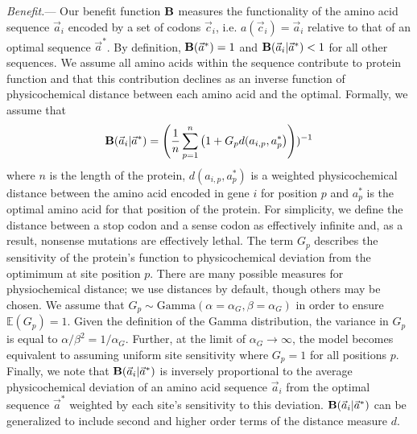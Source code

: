 \documentclass[12pt,letterpaper]{article}
\renewcommand{\subsubsection}[1]{%
\vspace{2ex}
\noindent
\textit{#1.}---}
\newcommand{\EE}{\mathbb{E}} %
\newcommand{\Funcaoptvec}{\ensuremath{\Func(\aoptvec)}\xspace}
\newcommand{\Funcaveci}{\ensuremath{\Func(\aveci|\aoptvec)}\xspace}
\newcommand{\Func}{\ensuremath{\text{\textbf{B}}}\xspace}
\newcommand{\aip}{\ensuremath{a_{i,p}}\xspace}
\newcommand{\alphag}{\ensuremath{\alpha_G}\xspace}
\newcommand{\aoptp}{\ensuremath{a^*_p}\xspace}
\newcommand{\aoptvec}{\ensuremath{\Vec{a}^*}\xspace}
\newcommand{\aveci}{\ensuremath{\Vec{a}_i}\xspace}
\newcommand{\cveci}{\ensuremath{\cvec_i}\xspace}
\newcommand{\cvec}{\ensuremath{\Vec{c}}\xspace}
\newcommand{\gp}{\ensuremath{{G_p}}\xspace}
\begin{document}
\subsubsection{Benefit}
Our benefit function \Func measures the functionality of the amino acid sequence \aveci encoded by a set of codons \cveci, i.e. $a(\cveci) = \aveci$ relative to that of an optimal sequence $\aoptvec$.
By definition, $\Funcaoptvec = 1$ and $\Funcaveci < 1$ for all other sequences.
We assume all amino acids within the sequence contribute to protein function and that this contribution declines as an inverse function of physicochemical distance between each amino acid and the optimal.
Formally, we assume that
\begin{equation}
\Funcaveci = \left(\frac{1}{n} \sum_{p=1}^n \left(1 + \gp d(\aip, \aoptp\right)\right))^{-1}
\end{equation}
where $n$ is the length of the protein, $d(\aip, \aoptp)$ is a weighted physicochemical distance between the amino acid encoded in gene $i$ for position $p$ and $\aoptp$ is the optimal amino acid for that position of the protein.
For simplicity, we define the distance between a stop codon and a sense codon as effectively infinite and, as a result, nonsense mutations are effectively lethal.
The term \gp describes the sensitivity of the protein's function to physicochemical deviation from the optimimum at site position $p$.
There are many possible measures for physiochemical distance; we use \citet{Grantham1974} distances by default, though others may be chosen.
We assume that $\gp \sim \text{Gamma}\left(\alpha = \alphag, \beta = \alphag\right)$ in order to ensure $\EE(\gp) = 1$.
Given the definition of the Gamma distribution, the variance in \gp is equal to $\alpha/\beta^2 = 1/\alphag$.
Further, at the limit of $\alphag \rightarrow \infty$, the model becomes equivalent to assuming uniform site sensitivity where  $\gp = 1$ for all positions $p$.
Finally, we note that  \Funcaveci is inversely proportional to the average physicochemical deviation of an amino acid sequence \aveci from the optimal sequence \aoptvec weighted by each site's sensitivity to this deviation.
\Funcaveci can be generalized to include second and higher order terms of the distance measure $d$.
\end{document}
